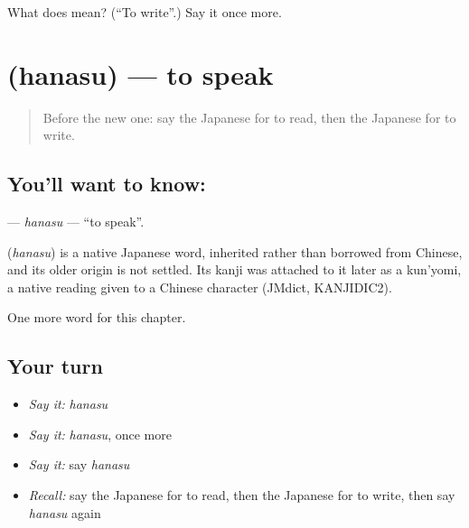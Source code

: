 \begin{tcolorbox}[breakable,colback=teal!4,colframe=teal!35!black,title={Before you move on}]
What does  mean? (\textquotedblleft{}To write\textquotedblright{}.) Say it once more.
\end{tcolorbox}
\section[\texorpdfstring{\ja{はなす} (hanasu)}{はなす (hanasu)}]{ (hanasu) — to speak}

\label{lesson:JA-C27-hanasu}



\begin{quote}
Before the new one: say the Japanese for to read, then the Japanese for to write.
\end{quote}

\subsection*{You'll want to know: }
\textbf{} — \emph{hanasu} — \textquotedblleft{}to speak\textquotedblright{}.

\begin{cousinweb}
\textbf{} (\emph{hanasu}) is a native Japanese word, inherited rather than borrowed from Chinese, and its older origin is not settled. Its kanji was attached to it later as a kun'yomi, a native reading given to a Chinese character (JMdict, KANJIDIC2).
\end{cousinweb}

\begin{grammarlens}[title={What you've built}]
One more word for this chapter.
\end{grammarlens}

\subsection*{Your turn}
\begin{itemize}
\raggedright
  \item \emph{Say it:} \emph{hanasu}
  \item \emph{Say it:} \emph{hanasu}, once more
  \item \emph{Say it:} say \emph{hanasu}
  \item \emph{Recall:} say the Japanese for to read, then the Japanese for to write, then say \emph{hanasu} again
\end{itemize}

